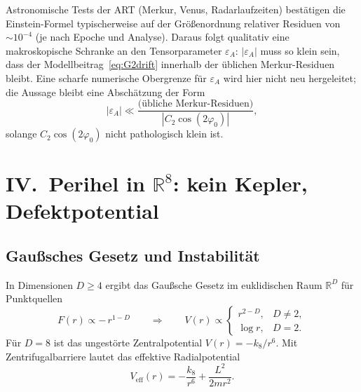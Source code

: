 \documentclass[11pt,a4paper]{article}
\theoremstyle{definition}
\theoremstyle{remark}
\newcommand{\R}{\mathbb{R}}
\begin{document}
Astronomische Tests der ART (Merkur, Venus, Radarlaufzeiten) bestätigen die
Einstein-Formel typischerweise auf der Größenordnung relativer Residuen von
\(\sim 10^{-4}\) (je nach Epoche und Analyse). Daraus folgt qualitativ eine makroskopische
Schranke an den Tensorparameter \(\varepsilon_A\): \(|\varepsilon_A|\) muss so klein sein,
dass der Modellbeitrag~\eqref{eq:G2drift} innerhalb der üblichen Merkur-Residuen bleibt.
Eine scharfe numerische Obergrenze für \(\varepsilon_A\) wird hier nicht neu hergeleitet;
die Aussage bleibt eine Abschätzung der Form
\begin{equation}
  |\varepsilon_A|\ll\frac{\text{(übliche Merkur-Residuen)}}{|C_2\cos(2\varphi_0)|},
\end{equation}
solange \(C_2\cos(2\varphi_0)\) nicht pathologisch klein ist.

\section{IV.\ Perihel in \texorpdfstring{\(\R^8\)}{R\string^8}: kein Kepler, Defektpotential}

\subsection{Gaußsches Gesetz und Instabilität}

In Dimensionen \(D\geq 4\) ergibt das Gaußsche Gesetz im euklidischen Raum \(\R^D\) für
Punktquellen
\begin{equation}
  F(r)\propto -\,r^{1-D}\qquad\Rightarrow\qquad
  V(r)\propto
  \begin{cases}
    r^{2-D}, & D\neq 2,\\
    \log r, & D=2.
  \end{cases}
\end{equation}
Für \(D=8\) ist das ungestörte Zentralpotential \(V(r)=-k_8/r^6\). Mit Zentrifugalbarriere
lautet das effektive Radialpotential
\begin{equation}
  V_{\mathrm{eff}}(r)=-\frac{k_8}{r^6}+\frac{L^2}{2m r^2}.
  \label{eq:Veff8}
\end{equation}
\end{document}
